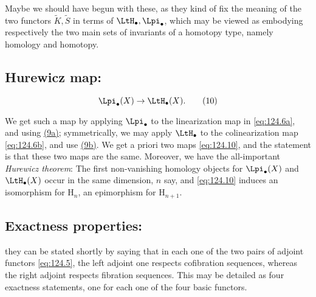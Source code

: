 Maybe we should have begun with these, as they kind of fix the meaning
of the two functors $\widetilde K, \widetilde S$ in terms of
$\LtH_\bullet, \Lpi_\bullet$, which may be viewed as embodying
respectively the two main sets of invariants of a homotopy type,
namely homology and homotopy.

\subsection[Hurewicz map]{Hurewicz map:}
\label{subsec:124.C}%
\begin{equation}
  \label{eq:124.10}
  \Lpi_\bullet(X) \to \LtH_\bullet(X).\tag{10}
\end{equation}

We get such a map by applying $\Lpi_\bullet$ to the linearization map
in \eqref{eq:124.6a}, and using \hyperref[eq:124.9]{(9a)};
symmetrically, we may apply $\LtH_\bullet$ to the colinearization map
\eqref{eq:124.6b}, and use \hyperref[eq:124.9]{(9b)}. We get a priori
two maps \eqref{eq:124.10}, and the statement is that these two maps
are the same. Moreover, we have the all-important \emph{Hurewicz
  theorem}: The first non-vanishing homology objects for
$\Lpi_\bullet(X)$ and $\LtH_\bullet(X)$ occur in the same dimension,
$n$ say, and \eqref{eq:124.10} induces an isomorphism for $\mathrm
H_n$, an epimorphism for $\mathrm H_{n+1}$.

\subsection[Exactness properties]{Exactness properties:}
\label{subsec:124.D}%
they can be stated shortly by saying that in each one of the two pairs
of adjoint functors \eqref{eq:124.5}, the left adjoint one respects
cofibration sequences, whereas the right adjoint respects fibration
sequences. This may be detailed as four exactness statements, one for
each one of the four basic functors.

